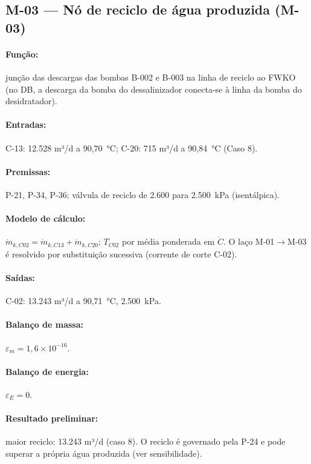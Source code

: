 \documentclass[11pt,a4paper]{article}
\numberwithin{equation}{section}
\numberwithin{table}{section}
\numberwithin{figure}{section}
\begin{document}
\subsection{M-03 --- Nó de reciclo de água produzida (M-03)}
\paragraph{Função:} junção das descargas das bombas B-002 e B-003 na linha de reciclo ao FWKO (no DB, a descarga da bomba do dessalinizador conecta-se à linha da bomba do desidratador).
\paragraph{Entradas:} C-13: 12.528 m³/d a 90,70~\si{\celsius}; C-20: 715 m³/d a 90,84~\si{\celsius} (Caso 8).
\paragraph{Premissas:} P-21, P-34, P-36; válvula de reciclo de 2.600 para 2.500~\si{\kilo\pascal} (isentálpica).
\paragraph{Modelo de cálculo:} $\dot m_{k,C02}=\dot m_{k,C13}+\dot m_{k,C20}$; $T_{C02}$ por média ponderada em $\dot C$. O laço M-01$\to$M-03 é resolvido por substituição sucessiva (corrente de corte C-02).
\paragraph{Saídas:} C-02: 13.243 m³/d a 90,71~\si{\celsius}, 2.500~\si{\kilo\pascal}.
\paragraph{Balanço de massa:} $\varepsilon_m=$$1{,}6\times10^{-16}$.
\paragraph{Balanço de energia:} $\varepsilon_E=$$0$.
\paragraph{Resultado preliminar:} maior reciclo: 13.243 m³/d (caso 8). O reciclo é governado pela P-24 e pode superar a própria água produzida (ver sensibilidade).
\end{document}

